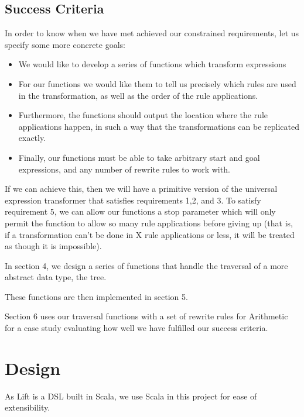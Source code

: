 \documentclass{l4proj}
\begin{document}
 
 
\section{Success Criteria}
In order to know when we have met achieved our constrained requirements, let us specify some more concrete goals:
\begin{itemize}
    \item We would like to develop a series of functions which transform expressions
    \item For our functions we would like them to tell us precisely which rules are used in the transformation, as well as the order of the rule applications.
    \item Furthermore, the functions should output the location where the rule applications happen, in such a way that the transformations can be replicated exactly.
    \item Finally, our functions must be able to take arbitrary start and goal expressions, and any number of rewrite rules to work with.
\end{itemize}
 
 
If we can achieve this, then we will have a primitive version of the universal expression transformer that satisfies requirements 1,2, and 3. To satisfy requirement 5, we can allow our functions a stop parameter which will only permit the function to allow so many rule applications before giving up (that is, if a transformation can't be done in X rule applications or less, it will be treated as though it is impossible).
 
 
In section 4, we design a series of functions that handle the traversal of a more abstract data type, the tree. 

These functions are then implemented in section 5.

Section 6 uses our traversal functions with a set of rewrite rules for Arithmetic for a case study evaluating how well we have fulfilled our success criteria.
 
\chapter{Design} \label{design}

As Lift is a DSL built in Scala, we use Scala in this project for ease of extensibility.
\end{document}
